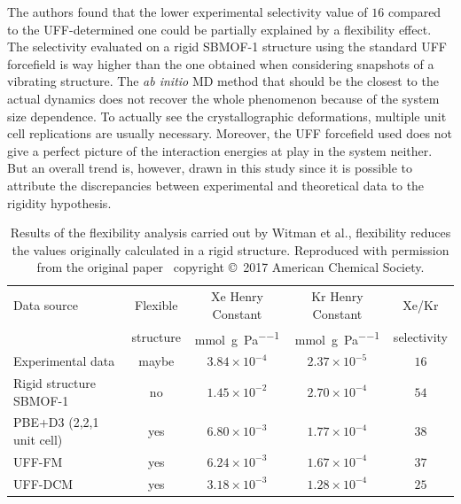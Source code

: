 \documentclass[main]{subfiles}
\begin{document}
The authors found that the lower experimental selectivity value of $16$ compared to the UFF-determined one could be partially explained by a flexibility effect. The selectivity evaluated on a rigid SBMOF-1 structure using the standard UFF forcefield is way higher than the one obtained when considering snapshots of a vibrating structure. The \emph{ab initio} MD method that should be the closest to the actual dynamics does not recover the whole phenomenon because of the system size dependence. To actually see the crystallographic deformations, multiple unit cell replications are usually necessary. Moreover, the UFF forcefield used does not give a perfect picture of the interaction energies at play in the system neither. But an overall trend is, however, drawn in this study since it is possible to attribute the discrepancies between experimental and theoretical data to the rigidity hypothesis.

\begin{table}[t]
  \centering
  \small
  \begin{tabular}{|l|c|c|c|c|}
  \hline
    Data source & Flexible &  Xe Henry Constant &  Kr Henry Constant &  Xe/Kr \\
      & structure &  \si{\mmol\per\g\per\Pa} &  \si{\mmol\per\g\per\Pa} &  selectivity \\
  \hline
    Experimental data\autocite{Banerjee_2016} & maybe &  $3.84\times 10^{-4}$ &  $2.37\times 10^{-5}$ &  $16$ \\
  \hline
    Rigid structure SBMOF-1\autocite{Banerjee_2016} & no &  $1.45\times 10^{-2}$ &  $2.70\times 10^{-4}$ &  $54$ \\
    PBE+D3 (2,2,1 unit cell) & yes &  $6.80\times 10^{-3}$ &  $1.77\times 10^{-4}$ &  $38$ \\
    UFF-FM & yes &  $6.24\times 10^{-3}$ &  $1.67\times 10^{-4}$ &  $37$ \\
    UFF-DCM & yes &  $3.18\times 10^{-3}$ &  $1.28\times 10^{-4}$ &  $25$ \\
  \hline
\end{tabular}
\caption{ Results of the flexibility analysis carried out by Witman et al., flexibility reduces the values originally calculated in a rigid structure. Reproduced with permission from the original paper~\cite{Witman_2017} copyright \copyright\ 2017 American Chemical Society.}
\label{table:witman_sbmof}
\end{table}
\end{document}
